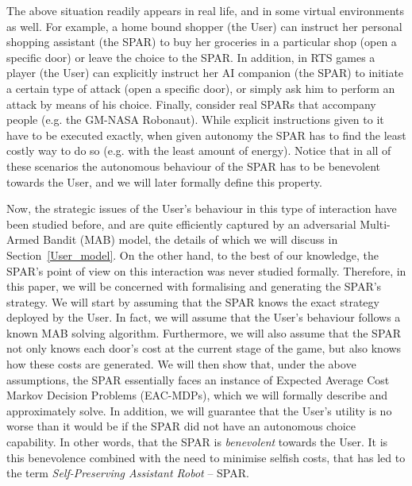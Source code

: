\documentclass{msdm2012}
\begin{document}
The above situation readily appears in real life, and in some virtual
environments as well. For example, a home bound shopper (the User) can
instruct her personal shopping assistant (the SPAR) to buy her
groceries in a particular shop (open a specific door) or leave the
choice to the SPAR. In addition, in RTS games a player (the User) can
explicitly instruct her AI companion (the SPAR) to initiate a certain
type of attack (open a specific door), or simply ask him to perform an
attack by means of his choice. Finally, consider real SPARs that
accompany people (e.g. the GM-NASA Robonaut). While explicit
instructions given to it have to be executed exactly, when given
autonomy the SPAR has to find the least costly way to do so (e.g. with
the least amount of energy). Notice that in all of these scenarios the
autonomous behaviour of the SPAR has to be benevolent towards the
User, and we will later formally define this property.

Now, the strategic issues of the User's behaviour in this type of
interaction have been studied before, and are quite efficiently
captured by an adversarial Multi-Armed Bandit (MAB) model, the details
of which we will discuss in Section~\ref{User_model}. On the other
hand, to the best of our knowledge, the SPAR's point of view on this
interaction was never studied formally. Therefore, in this paper, we
will be concerned with formalising and generating the SPAR's
strategy. We will start by assuming that the SPAR knows the exact
strategy deployed by the User. In fact, we will assume that the User's
behaviour follows a known MAB solving algorithm. Furthermore, we will
also assume that the SPAR not only knows each door's cost at the
current stage of the game, but also knows how these costs are
generated. We will then show that, under the above assumptions, the
SPAR essentially faces an instance of Expected Average Cost Markov
Decision Problems (EAC-MDPs), which we will formally describe and
approximately solve. In addition, we will guarantee that the User's
utility is no worse than it would be if the SPAR did not have an
autonomous choice capability. In other words, that the SPAR is {\em
  benevolent} towards the User. It is this benevolence combined with
the need to minimise selfish costs, that has led to the term {\em
  Self-Preserving Assistant Robot} -- SPAR.

\end{document}
